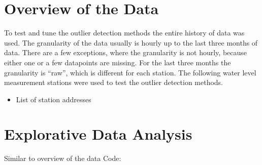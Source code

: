 \section{Overview of the Data}
To test and tune the outlier detection methods the entire history of data was used. The granularity of the data usually is hourly up to the last three months of data. There are a few exceptions, where the granularity is not hourly, because either one or a few datapoints are missing. For the last three months the granularity is ``raw'', which is different for each station. 
The following water level measurement stations were used to test the outlier detection methods.
\begin{itemize}
    \item List of station addresses 
\end{itemize}

\section{Explorative Data Analysis}
Similar to overview of the data
Code: \cite{zelenayOutlierDetectionWater2022}
